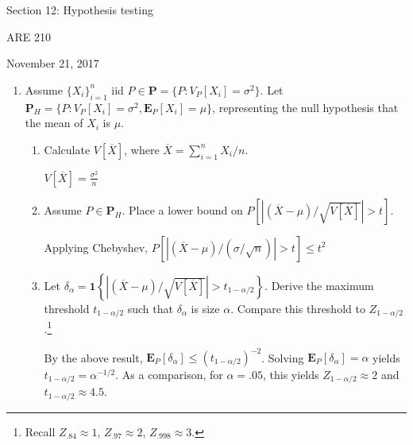 \documentclass[12pt,english]{article}
\begin{document}
\begin{center}
{\Large{}Section 12: Hypothesis testing}
\par\end{center}{\Large \par}

\begin{center}
ARE 210
\par\end{center}

\begin{center}
November 21, 2017
\par\end{center}

\begin{enumerate}
	\item Assume $\{ X_{i} \}_{i=1}^{n}$ iid $P \in \mathbf{P} = \{ P : V_{P}[X_{i}] = \sigma^{2} \}$. Let $\mathbf{P}_{H} = \{ P : V_{P}[X_{i}] =  \sigma^{2}, \mathbf{E}_{P}[X_{i}] = \mu \}$, representing the null hypothesis that the mean of $X_{i}$ is $\mu$.
	\begin{enumerate}
		\item Calculate $V[\overline{X}]$, where $\overline{X} = \sum_{i=1}^{n} X_{i} / n$.
		\vspace{1em}
		
		$V[\overline{X}] = \frac{\sigma^{2}}{n}$
		
		\vspace{1em}
		\item Assume $P \in \mathbf{P}_{H}$. Place a lower bound on $P\left[\left|(\overline{X} - \mu)/\sqrt{V[\overline{X}]} \right| > t \right]$.
		\vspace{1em}
		
		Applying Chebyshev, $P\left[\left|(\overline{X} - \mu)/(\sigma/\sqrt{n}) \right| > t \right] \leq t^{2}$
		
		\vspace{1em}
		\item Let $\delta_{\alpha} = \mathbf{1}\left\{ \left|(\overline{X} - \mu)/\sqrt{V[\overline{X}]} \right| > t_{1 - \alpha/2} \right\}$. Derive the maximum threshold $t_{1 - \alpha/2}$ such that $\delta_{\alpha}$ is size $\alpha$. Compare this threshold to $Z_{1 - \alpha/2}$.\footnote{Recall $Z_{.84} \approx 1$, $Z_{.97} \approx 2$, $Z_{.998} \approx 3$.}
		\vspace{1em}
		
		By the above result, $\mathbf{E}_{P}[\delta_{\alpha}] \leq (t_{1-\alpha/2})^{-2}$. Solving $\mathbf{E}_{P}[\delta_{\alpha}] = \alpha$ yields $t_{1-\alpha/2} = \alpha^{-1/2}$. As a comparison, for $\alpha = .05$, this yields $Z_{1 - \alpha/2} \approx 2$ and $t_{1 - \alpha/2} \approx 4.5$.
		

\end{enumerate}
\end{enumerate}
\end{document}
